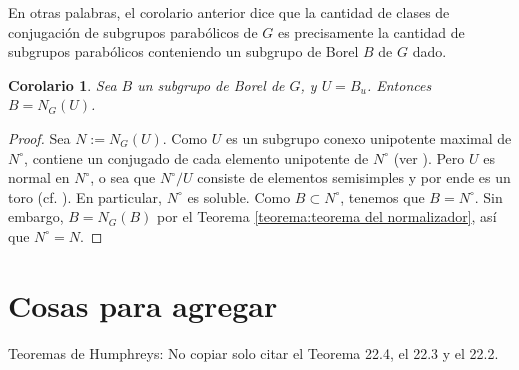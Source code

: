 \documentclass[spanish,10pt]{amsart}
\newtheorem{corollary}[theorem]{Corolario}
\theoremstyle{definition}
\theoremstyle{remark}
\numberwithin{equation}{section}
\begin{document}
En otras palabras, el corolario anterior dice que la cantidad de clases de conjugación de subgrupos parabólicos de $G$ es precisamente la cantidad de subgrupos parabólicos conteniendo un subgrupo de Borel $B$ de $G$ dado.

\begin{corollary}
Sea $B$ un subgrupo de Borel de $G$, y $U = B_u$. Entonces $B = N_G (U)$.
\end{corollary}
\begin{proof}
Sea $N := N_G (U)$. Como $U$ es un subgrupo conexo unipotente maximal de $N^\circ$, contiene un conjugado de cada elemento unipotente de $N^\circ$ (ver \cite[Teorema 22.2]{humphreys2012linearAlgebraicGroups}). Pero $U$ es normal en $N^\circ$, o sea que $N^\circ / U$ consiste de elementos semisimples y por ende es un toro (cf. \cite[Ejercicio 21.2]{humphreys2012linearAlgebraicGroups}). En particular, $N^\circ$ es soluble. Como $B \subset N^\circ$, tenemos que $B = N^\circ$. Sin embargo, $B = N_G (B)$ por el Teorema \ref{teorema:teorema del normalizador}, así que $N^\circ = N$.
\end{proof}




\section{Cosas para agregar}



Teoremas de Humphreys: No copiar solo citar el Teorema 22.4, el 22.3 y el 22.2.










\end{document}
